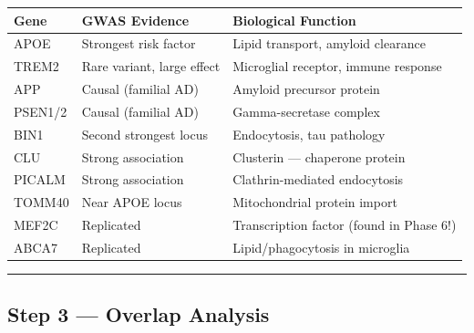 \documentclass[
]{article}
\begin{document}
\begin{longtable}[]{@{}
  >{\raggedright\arraybackslash}p{}
  >{\raggedright\arraybackslash}p{}
  >{\raggedright\arraybackslash}p{}@{}}
\toprule\noalign{}
\begin{minipage}[b]{\linewidth}\raggedright
Gene
\end{minipage} & \begin{minipage}[b]{\linewidth}\raggedright
GWAS Evidence
\end{minipage} & \begin{minipage}[b]{\linewidth}\raggedright
Biological Function
\end{minipage} \\
\midrule\noalign{}
\endhead
\bottomrule\noalign{}
\endlastfoot
APOE & Strongest risk factor & Lipid transport, amyloid clearance \\
TREM2 & Rare variant, large effect & Microglial receptor, immune
response \\
APP & Causal (familial AD) & Amyloid precursor protein \\
PSEN1/2 & Causal (familial AD) & Gamma-secretase complex \\
BIN1 & Second strongest locus & Endocytosis, tau pathology \\
CLU & Strong association & Clusterin --- chaperone protein \\
PICALM & Strong association & Clathrin-mediated endocytosis \\
TOMM40 & Near APOE locus & Mitochondrial protein import \\
MEF2C & Replicated & Transcription factor (found in Phase 6!) \\
ABCA7 & Replicated & Lipid/phagocytosis in microglia \\
\end{longtable}

\begin{center}\rule{0.5\linewidth}{0.5pt}\end{center}

\subsection{Step 3 --- Overlap Analysis}\label{step-3-overlap-analysis}
\end{document}

